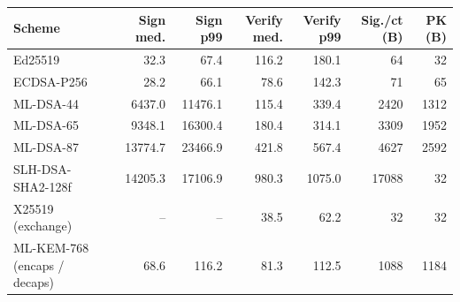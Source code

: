 \begin{tabular}{@{}lrrrrrr@{}}
\toprule
Scheme & Sign med. & Sign p99 & Verify med. & Verify p99 & Sig./ct (B) & PK (B) \\
\midrule
Ed25519 & 32.3 & 67.4 & 116.2 & 180.1 & 64 & 32 \\
ECDSA-P256 & 28.2 & 66.1 & 78.6 & 142.3 & 71 & 65 \\
ML-DSA-44 & 6437.0 & 11476.1 & 115.4 & 339.4 & 2420 & 1312 \\
ML-DSA-65 & 9348.1 & 16300.4 & 180.4 & 314.1 & 3309 & 1952 \\
ML-DSA-87 & 13774.7 & 23466.9 & 421.8 & 567.4 & 4627 & 2592 \\
SLH-DSA-SHA2-128f & 14205.3 & 17106.9 & 980.3 & 1075.0 & 17088 & 32 \\
\midrule
X25519 (exchange) & -- & -- & 38.5 & 62.2 & 32 & 32 \\
ML-KEM-768 (encaps / decaps) & 68.6 & 116.2 & 81.3 & 112.5 & 1088 & 1184 \\
\bottomrule
\end{tabular}
